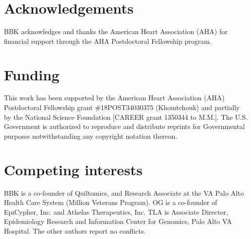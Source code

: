 \documentclass[letter]{bioinfo}
\begin{document}
	\enlargethispage{12pt}
	
	
	
	
	\section*{Acknowledgements}
	
	BBK acknowledges and thanks the American Heart Association (AHA) for financial support through the AHA Postdoctoral Fellowship program.
	\vspace*{-12pt}
	
	\section*{Funding}
	
	This work has been supported by the American Heart Association (AHA) Postdoctoral Fellowship grant \#18POST34030375 (Khomtchouk) and partially by the National Science Foundation [CAREER grant 1350344 to M.M.]. The U.S. Government is authorized to reproduce and distribute reprints for Governmental purposes notwithstanding any copyright notation thereon.\vspace*{-12pt}
	
	\section*{Competing interests}
	
	BBK is a co-founder of Quiltomics, and Research Associate at the VA Palo Alto Health Care System (Million Veterans Program).  OG is a co-founder of EpiCypher, Inc. and Athelas Therapeutics, Inc.  TLA is Associate Director, Epidemiology Research and Information 
    Center for Genomics, Palo Alto VA Hospital.  The other authors report no conflicts.\vspace*{-12pt} 
	
	
	
	
	
	
\end{document}
